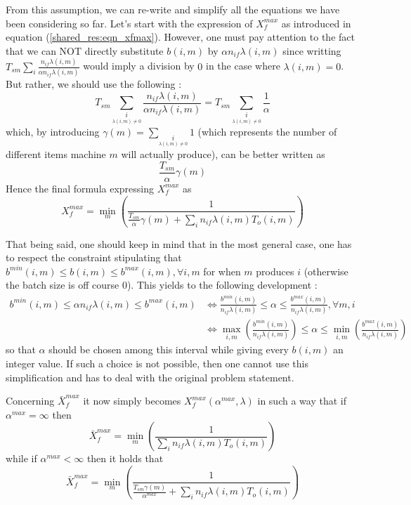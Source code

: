 From this assumption, we can re-write and simplify all the equations we have been considering so far. Let's start with the expression of $X_f^{max}$ as introduced in equation (\ref{shared_res:eqn_xfmax}). However, one must pay attention to the fact that we can NOT directly substitute $b(i,m)$ by $\alpha n_{if}\lambda(i,m)$ since writting $T_{sm}\sum_i\frac{n_{if}\lambda(i,m)}{\alpha n_{if}\lambda(i,m)}$ would imply a division by $0$ in the case where $\lambda(i,m) = 0$. But rather, we should use the following : 
\[
    T_{sm}\sum_{\underset{\lambda(i,m)\ne 0}{i}} \frac{n_{if}\lambda(i,m)}{\alpha n_{if}\lambda(i,m)}
    = T_{sm}\sum_{\underset{\lambda(i,m)\ne 0}{i}} \frac{1}{\alpha}
\]
which, by introducing $\gamma(m) = \sum_{\underset{\lambda(i,m)\ne 0}{i}} 1$ (which represents the number of different items machine $m$ will actually produce), can be better written as
\[
    \frac{T_{sm}}{\alpha}\gamma(m)
\]
Hence the final formula expressing $X_f^{max}$ as 
\[
    X_f^{max} = \min_m\left( \frac{1}{ \frac{T_{sm}}{\alpha}\gamma(m) + \sum_i n_{if}\lambda(i,m)T_o(i,m) } \right)
\]

That being said, one should keep in mind that in the most general case, one has to respect the constraint stipulating that $b^{min}(i,m)\le b(i,m) \le b^{max}(i,m),  \forall i,m$ for when $m$ produces $i$ (otherwise the batch size is off course $0$). This yields to the following development :
\[
    \begin{split}
        b^{min}(i,m) \le \alpha n_{if}\lambda(i,m) \le b^{max}(i,m)
        &\Leftrightarrow
        \frac{ b^{min}(i,m) }{ n_{if}\lambda(i,m) } \le \alpha \le \frac{ b^{max}(i,m) }{ n_{if}\lambda(i,m) }, \forall m,i\\
        &\Leftrightarrow
        \max_{i,m}\left( \frac{ b^{min}(i,m) }{ n_{if}\lambda(i,m) } \right) \le \alpha \le \min_{i,m}\left( \frac{ b^{max}(i,m) }{ n_{if}\lambda(i,m) } \right)
    \end{split}
\]
so that $\alpha$ should be chosen among this interval while giving every $b(i,m)$ an integer value. If such a choice is not possible, then one cannot use this simplification and has to deal with the original problem statement. 

Concerning $\bar X_f^{max}$ it now simply becomes $X_f^{max}(\alpha^{max}, \lambda)$ in such a way that if $\alpha^{max}=\infty$ then
\[
    \bar X_f^{max} = \min_m\left( \frac{1}{\sum_i n_{if}\lambda(i,m)T_o(i,m)} \right)
\]
while if $\alpha^{max}<\infty$ then it holds that
\[
    \bar X_f^{max} = \min_m\left( \frac{1}{ \frac{T_{sm}\gamma(m)}{\alpha^{max}} + \sum_i n_{if}\lambda(i,m)T_o(i,m)} \right)
\]

